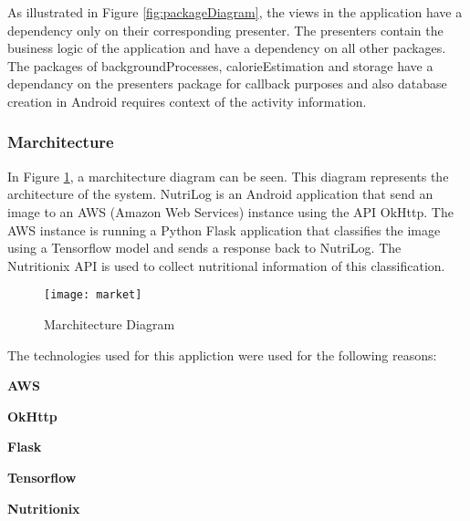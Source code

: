 As illustrated in Figure \ref{fig:packageDiagram}, the views in the application
have a dependency only on their corresponding presenter.
The presenters contain the business logic of the  application and have a dependency on all other packages.
The packages of backgroundProcesses, calorieEstimation and storage have a dependancy on the presenters package for callback purposes and also database creation in Android requires context of the activity information.

\subsubsection*{Marchitecture}
In Figure \ref{fig:market}, a marchitecture diagram can be seen.
This diagram represents the architecture of the system.
NutriLog is an Android application that send an image to an AWS (Amazon Web Services) instance using the API OkHttp. The AWS instance is running a Python Flask application that classifies the image using a Tensorflow model and sends a response back to NutriLog. The Nutritionix API is used to collect nutritional information of this classification.

\begin{figure}[h]
    \centering
    \texttt{[image: market]}
    \caption{Marchitecture Diagram}
    \label{fig:market}
\end{figure}

The technologies used for this appliction were used for the following reasons:

\textbf{AWS}

\textbf{OkHttp}

\textbf{Flask}

\textbf{Tensorflow}

\textbf{Nutritionix}